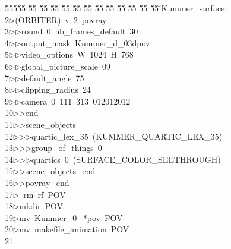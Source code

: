 %
%
\begin{tabbing}
55555 \= 55 \= 55 \= 55 \= 55 \= 55 \= 55 \= 55 \= 55 \= 55 \= 55 \= 55 \= 55 \= \>Kummer\_surface:\\[0pt]
2\>$\triangleright$\>(ORBITER)\ v\ 2\ povray\ \\[0pt]
3\>$\triangleright$\>$\triangleright$\>round\ 0\ nb\_frames\_default\ 30\ \\[0pt]
4\>$\triangleright$\>$\triangleright$\>output\_mask\ Kummer\_d\_03dpov\ \\[0pt]
5\>$\triangleright$\>$\triangleright$\>video\_options\ W\ 1024\ H\ 768\ \\[0pt]
6\>$\triangleright$\>$\triangleright$\>global\_picture\_scale\ 09\ \\[0pt]
7\>$\triangleright$\>$\triangleright$\>default\_angle\ 75\ \\[0pt]
8\>$\triangleright$\>$\triangleright$\>clipping\_radius\ 24\ \\[0pt]
9\>$\triangleright$\>$\triangleright$\>camera\ 0\ 111\ 313\ 012012012\ \\[0pt]
10\>$\triangleright$\>$\triangleright$\>end\ \\[0pt]
11\>$\triangleright$\>$\triangleright$\>scene\_objects\ \\[0pt]
12\>$\triangleright$\>$\triangleright$\>$\triangleright$\>quartic\_lex\_35\ (KUMMER\_QUARTIC\_LEX\_35)\ \\[0pt]
13\>$\triangleright$\>$\triangleright$\>$\triangleright$\>group\_of\_things\ 0\ \\[0pt]
14\>$\triangleright$\>$\triangleright$\>$\triangleright$\>quartics\ 0\ (SURFACE\_COLOR\_SEETHROUGH)\ \\[0pt]
15\>$\triangleright$\>$\triangleright$\>scene\_objects\_end\ \\[0pt]
16\>$\triangleright$\>$\triangleright$\>povray\_end\\[0pt]
17\>$\triangleright$\>\ rm\ rf\ POV\\[0pt]
18\>$\triangleright$\>mkdir\ POV\\[0pt]
19\>$\triangleright$\>mv\ Kummer\_0\_*pov\ POV\\[0pt]
20\>$\triangleright$\>mv\ makefile\_animation\ POV\\[0pt]
21\>\end{tabbing}
